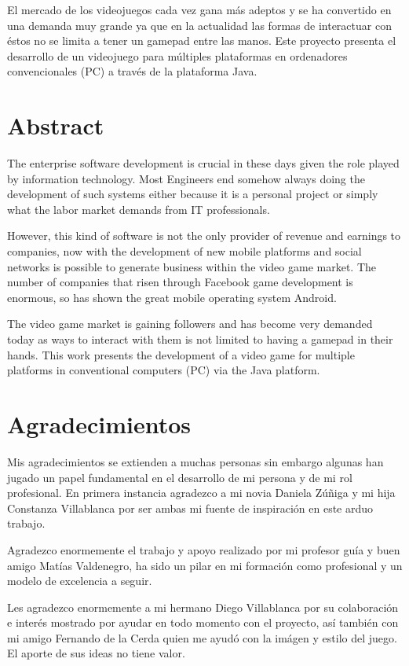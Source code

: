 \documentclass[a4paper,12pt,openany,oneside]{book}
\begin{document}
El mercado de los videojuegos cada vez gana más adeptos y se ha convertido en una demanda muy grande ya que en la actualidad las formas de interactuar con éstos no se limita a tener un gamepad entre las manos. Este proyecto presenta el desarrollo de un videojuego para múltiples plataformas en ordenadores convencionales (PC) a través de la plataforma Java.
\chapter*{Abstract}
\thispagestyle{empty}
The enterprise software development is crucial in these days given the role played by information technology. Most Engineers end somehow always doing the development of such systems either because it is a personal project or simply what the labor market demands from IT professionals.

However, this kind of software is not the only provider of revenue and earnings to companies, now with the development of new mobile platforms and social networks is possible to generate business within the video game market. The number of companies that risen through Facebook game development is enormous, so has shown the great mobile operating system Android.

The video game market is gaining followers and has become very demanded today as ways to interact with them is not limited to having a gamepad in their hands. This work presents the development of a video game for multiple platforms in conventional computers (PC) via the Java platform.
\chapter*{Agradecimientos}
\thispagestyle{empty}
Mis agradecimientos se extienden a muchas personas sin embargo algunas han jugado un papel fundamental en el desarrollo de mi persona y de mi rol profesional. En primera instancia agradezco a mi novia Daniela Zúñiga y mi hija Constanza Villablanca por ser ambas mi fuente de inspiración en este arduo trabajo.

Agradezco enormemente el trabajo y apoyo realizado por mi profesor guía y buen amigo Matías Valdenegro, ha sido un pilar en mi formación como profesional y un modelo de excelencia a seguir.

Les agradezco enormemente a mi hermano Diego Villablanca por su colaboración e interés mostrado por ayudar en todo momento con el proyecto, así también con mi amigo Fernando de la Cerda quien me ayudó con la imágen y estilo del juego. El aporte de sus ideas no tiene valor.
\end{document}
